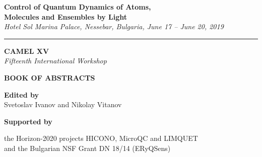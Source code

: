 \thispagestyle{empty}



\begin{center}

{\LARGE \textsf{\textbf{Control of Quantum Dynamics of Atoms,}\\ \vspace{2mm} \textbf{Molecules and Ensembles by Light} }}\\ \vspace{2mm}
\begingroup
    \fontsize{15pt}{12pt}\selectfont
    \emph{Hotel Sol Marina Palace, Nessebar, Bulgaria, June 17 -- June 20, 2019}
\endgroup

\vspace{3mm}

\hrule

\vspace{25mm}

{\fontsize{40}{48}\selectfont \textsf{\textbf{CAMEL XV}}}\\
\vspace{5mm}
{\LARGE \emph{Fifteenth International Workshop}}\\

\vspace{30mm}

{\fontsize{36}{40}\selectfont \textsf{\textbf{BOOK OF  ABSTRACTS}}}\\

\vspace{20mm}

\Large{\textbf{Edited by} \\ Svetoslav Ivanov and Nikolay Vitanov}

\vspace{55mm}

{\Large \textbf{Supported by}

the Horizon-2020 projects HICONO, MicroQC and LIMQUET\\
and the Bulgarian NSF Grant DN 18/14 (ERyQSens)

}




\end{center}

